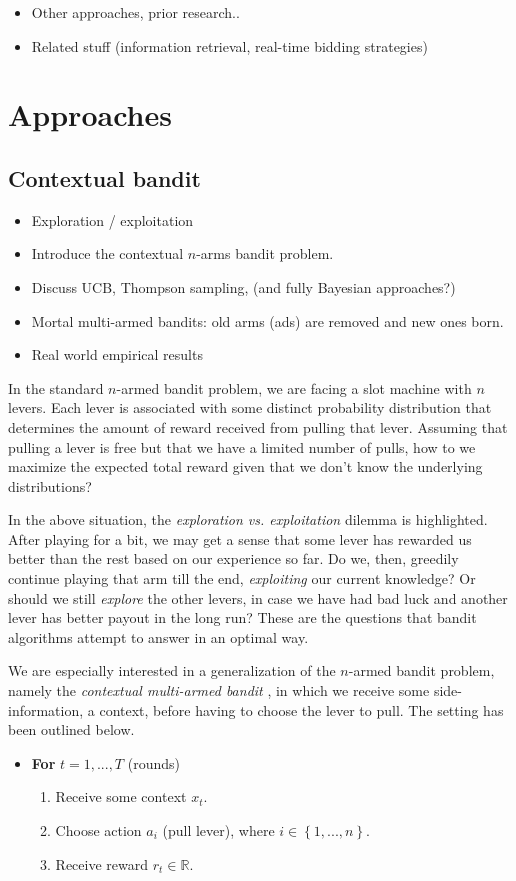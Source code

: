 \documentclass{article} %
\newcommand{\setof}[1]{\ensuremath{\left \{ #1 \right \}}}
\begin{document}
\begin{itemize}
  \item
  Other approaches, prior research..
  \item
  Related stuff (information retrieval, real-time bidding strategies)
\end{itemize}

\section{Approaches}


\subsection{Contextual bandit}
\begin{itemize}
  \item{Exploration / exploitation}
  \item{Introduce the contextual $n$-arms bandit problem.}
  \item{Discuss UCB, Thompson sampling, (and fully Bayesian approaches?)}
  \item{Mortal multi-armed bandits: old arms (ads) are removed and new ones
    born.}
  \item{Real world empirical results}
\end{itemize}

In the standard $n$-armed bandit problem, we are facing a slot machine with $n$
levers. Each lever is associated with some distinct probability distribution
that determines the amount of reward received from pulling that lever. Assuming
that pulling a lever is free but that we have a limited number of pulls, how to
we maximize the expected total reward given that we don't know the underlying
distributions? \cite{book}

In the above situation, the \emph{exploration vs. exploitation} dilemma is
highlighted. After playing for a bit, we may get a sense that some lever has
rewarded us better than the rest based on our experience so far. Do we, then,
greedily continue playing that arm till the end, \emph{exploiting} our current
knowledge? Or should we still \emph{explore} the other levers, in case we have
had bad luck and another lever has better payout in the long run? These are the
questions that bandit algorithms attempt to answer in an optimal way.

We are especially interested in a generalization of the $n$-armed bandit
problem, namely the \emph{contextual multi-armed bandit}
\cite{langford2007epoch}, in which we receive some side-information, a context,
before having to choose the lever to pull. The setting has been outlined below.
\begin{itemize}
  \item[]
    \textbf{For} $t = 1, ..., T$ (rounds)
    \begin{enumerate}
      \item{Receive some context $x_t$.}
      \item{Choose action  $a_i$ (pull lever), where $i \in \setof{1,...,n}$.}
      \item{Receive reward $r_t \in \mathbb{R}$.}
    \end{enumerate}
\end{itemize}
\end{document}
